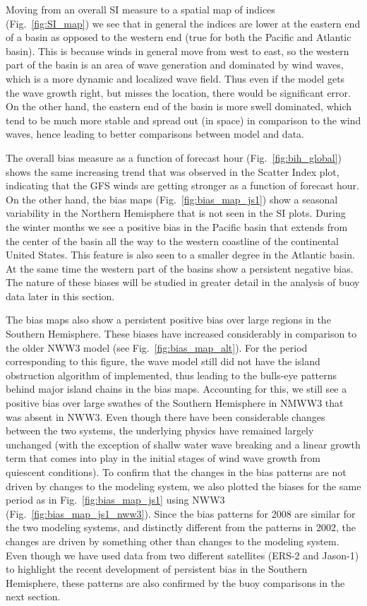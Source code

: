 \documentclass[12pt]{article}
\begin{document}
Moving from an overall SI measure to a spatial map of indices
(Fig.~\ref{fig:SI_map}) we see that in general the indices are lower
at the eastern end of a basin as opposed to the western end (true for
both the Pacific and Atlantic basin). This is because winds in general
move from west to east, so the western part of the basin is an area of
wave generation and dominated by wind waves, which is a more dynamic
and localized wave field. Thus even if the model gets the wave growth
right, but misses the location, there would be significant error. On
the other hand, the eastern end of the basin is more swell dominated,
which tend to be much more stable and spread out (in space) in
comparison to the wind waves, hence leading to better comparisons
between model and data.

The overall bias measure as a function of forecast hour
(Fig.~\ref{fig:bih_global}) shows the same increasing trend that was
observed in the Scatter Index plot, indicating that the GFS winds are
getting stronger as a function of forecast hour. On the other hand,
the bias maps (Fig.~\ref{fig:bias_map_js1}) show a seasonal
variability in the Northern Hemisphere that is not seen in the SI
plots. During the winter months we see a positive bias in the Pacific
basin that extends from the center of the basin all the way to the
western coastline of the continental United States. This feature is
also seen to a smaller degree in the Atlantic basin. At the same time
the western part of the basins show a persistent negative bias. The
nature of these biases will be studied in greater detail in the
analysis of buoy data later in this section.

The bias maps also show a persistent positive bias over large regions
in the Southern Hemisphere. These biases have increased considerably
in comparison to the older NWW3 model (see
Fig.~\ref{fig:bias_map_alt}). For the period corresponding to this
figure, the wave model still did not have the island obstruction
algorithm of \cite{tolman-03} implemented, thus leading to the
bulls-eye patterns behind major island chains in the bias
maps. Accounting for this, we still see a positive bias over large
swathes of the Southern Hemisphere in NMWW3 that was absent in
NWW3. Even though there have been considerable changes between the two
systems, the underlying physics have remained largely unchanged (with
the exception of shallw water wave breaking and a linear growth term
that comes into play in the initial stages of wind wave growth from
quiescent conditions). To confirm that the changes in the bias
patterns are not driven by changes to the modeling system, we also
plotted the biases for the same period as in
Fig.~\ref{fig:bias_map_js1} using NWW3
(Fig.~\ref{fig:bias_map_js1_nww3}). Since the bias patterns for 2008
are similar for the two modeling systems, and distinctly different
from the patterns in 2002, the changes are driven by something other
than changes to the modeling system. Even though we have used data
from two different satellites (ERS-2 and Jason-1) to highlight the
recent development of persistent bias in the Southern Hemisphere,
these patterns are also confirmed by the buoy comparisons in the next section.
 
\end{document}
